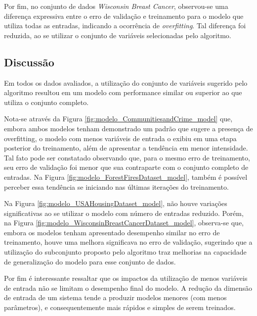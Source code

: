 Por fim, no conjunto de dados \textit{Wisconsin Breast Cancer}, observou-se uma diferença expressiva entre o erro de validação e treinamento para o modelo que utiliza todas as entradas, indicando a ocorrência de \textit{overfitting}. Tal diferença foi reduzida, ao se utilizar o conjunto de variáveis selecionadas pelo algoritmo.

\FloatBarrier
\subsection{Discussão}

Em todos os dados avaliados, a utilização do conjunto de variáveis sugerido pelo algoritmo resultou em um modelo com performance similar ou superior ao que utiliza o conjunto completo.

Nota-se através da Figura \ref{fig:modelo_CommunitiesandCrime_model} que, embora ambos modelos tenham demonstrado um padrão que sugere a presença de overfitting, o modelo com menos variáveis de entrada o exibiu em uma etapa posterior do treinamento, além de apresentar a tendência em menor intensidade. 
Tal fato pode ser constatado observando que, para o mesmo erro de treinamento, seu erro de validação foi menor que sua contraparte com o conjunto completo de entradas. Na Figura \ref{fig:modelo_ForestFiresDataset_model}, também é possível perceber essa tendência se iniciando nas últimas iterações do treinamento.

Na Figura \ref{fig:modelo_USAHousingDataset_model}, não houve variações significativas ao se utilizar o modelo com número de entradas reduzido. Porém, na Figura \ref{fig:modelo_WisconsinBreastCancerDataset_model}, observa-se que, embora os modelos tenham apresentado desempenho similar no erro de treinamento, houve uma melhora significava no erro de validação, sugerindo que a utilização do subconjunto proposto pelo algoritmo traz melhorias na capacidade de generalização do modelo para esse conjunto de dados.

Por fim é interessante ressaltar que os impactos da utilização de menos variáveis de entrada não se limitam o desempenho final do modelo. A redução da dimensão de entrada de um sistema tende a produzir modelos menores (com menos parâmetros), e consequentemente mais rápidos e simples de serem treinados.